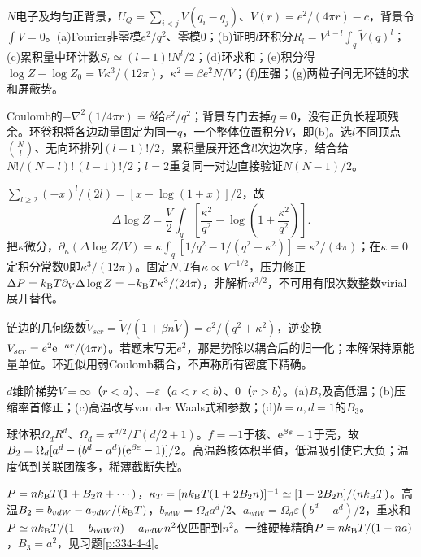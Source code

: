 \begin{exercise}[原题1(a)--(g)]\label{r:333-3-1}
$N$电子及均匀正背景，$U_Q=\sum_{i<j}V(q_i-q_j)$、$V(r)=e^2/(4\pi r)-c$，背景令$\int V=0$。(a)Fourier非零模$e^2/q^2$、零模0；(b)证明$l$环积分$R_l=V^{1-l}\int_q\widetilde V(q)^l$；(c)累积量中环计数$S_l\simeq(l-1)!N^l/2$；(d)环求和；(e)积分得$\log Z-\log Z_0=V\kappa^3/(12\pi)$，$\kappa^2=\beta e^2N/V$；(f)压强；(g)两粒子间无环链的求和屏蔽势。
\end{exercise}
\begin{solution}
Coulomb的$-\nabla^2(1/4\pi r)=\delta$给$e^2/q^2$；背景专门去掉$q=0$，没有正负长程项残余。环卷积将各边动量固定为同一$q$，一个整体位置积分$V$，即(b)。选$l$不同顶点$\binom Nl$、无向环排列$(l-1)!/2$，累积量展开还含$l!$次边次序，结合给$N!/(N-l)!\,(l-1)!/2$；$l=2$重复同一对边直接验证$N(N-1)/2$。

$\sum_{l\ge2}(-x)^l/(2l)=[x-\log(1+x)]/2$，故
\begin{equation}
\Delta\log Z=\frac V2\int_q\left[\frac{\kappa^2}{q^2}-\log\left(1+\frac{\kappa^2}{q^2}\right)\right].
\end{equation}
把$\kappa$微分，$\partial_\kappa(\Delta\log Z/V)=\kappa\int_q[1/q^2-1/(q^2+\kappa^2)]=\kappa^2/(4\pi)$；在$\kappa=0$定积分常数0即$\kappa^3/(12\pi)$。固定$N,T$有$\kappa\propto V^{-1/2}$，压力修正$\Delta P=k_{\mathrm B} T\partial_V\Delta\log Z=-k_{\mathrm B} T\kappa^3/(24\pi)$，非解析$n^{3/2}$，不可用有限次数整数virial展开替代。

链边的几何级数$\widetilde V_{scr}=\widetilde V/(1+\beta n\widetilde V)=e^2/(q^2+\kappa^2)$，逆变换$V_{scr}=e^2\mathrm e^{-\kappa r}/(4\pi r)$。若题末写无$e^2$，那是势除以耦合后的归一化；本解保持原能量单位。环近似用弱Coulomb耦合，不声称所有密度下精确。
\end{solution}
\begin{exercise}[原题2(a)--(d)]\label{r:333-3-2}
$d$维阶梯势$V=\infty$（$r<a$）、$-\varepsilon$（$a<r<b$）、0（$r>b$）。(a)$B_2$及高低温；(b)压缩率首修正；(c)高温改写van der Waals式和参数；(d)$b=a,d=1$的$B_3$。
\end{exercise}
\begin{solution}
球体积$\Omega_dR^d$、$\Omega_d=\pi^{d/2}/\Gamma(d/2+1)$。$f=-1$于核、$\mathrm e^{\beta\varepsilon}-1$于壳，故$B_2=\Omega_d[a^d-(b^d-a^d)(\mathrm e^{\beta\varepsilon}-1)]/2$。高温趋核体积半值，低温吸引使它大负；温度低到关联团簇多，稀薄截断失控。

$P=nk_{\mathrm B} T(1+B_2n+\cdots)$，$\kappa_T=[nk_{\mathrm B} T(1+2B_2n)]^{-1}\simeq[1-2B_2n]/(nk_{\mathrm B} T)$。高温$B_2=b_{vdW}-a_{vdW}/(k_{\mathrm B} T)$，$b_{vdW}=\Omega_da^d/2$、$a_{vdW}=\Omega_d\varepsilon(b^d-a^d)/2$，重求和$P\simeq nk_{\mathrm B} T/(1-b_{vdW}n)-a_{vdW}n^2$仅匹配到$n^2$。一维硬棒精确$P=nk_{\mathrm B} T/(1-na)$，$B_3=a^2$，见习题\ref{p:334-4-4}。
\end{solution}
